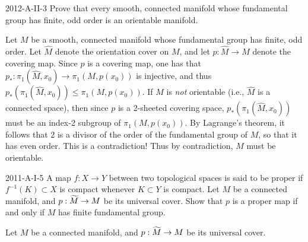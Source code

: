 \documentclass{article}
\begin{document}
	\begin{prb}{2012-A-II-3}
		Prove that every smooth, connected manifold whose fundamental group has finite, odd order is an orientable manifold. 
	\end{prb}
	Let $M$ be a smooth, connected manifold whose fundamental group has finite, odd order. Let $\hat{M}$ denote the orientation cover on $M$, and let $p: \hat{M} \to M$ denote the covering map. Since $p$ is a covering map, one has that $p_{\ast}: \pi_1(\hat{M}, x_0) \to \pi_1(M, p(x_0))$ is injective, and thus $p_\ast(\pi_1(\hat{M}, x_0)) \leq \pi_1(M, p(x_0))$. If $M$ is \textit{not} orientable (i.e., $\hat{M}$ is a connected space), then since $p$ is a 2-sheeted covering space, $p_\ast(\pi_1(\hat{M}, x_0))$ must be an index-2 subgroup of $\pi_1(M,p(x_0))$. By Lagrange's theorem, it follows that $2$ is a divisor of the order of the fundamental group of $M$, so that it has even order. This is a contradiction! Thus by contradiction, $M$ must be orientable. 
	
	\begin{prb}{2011-A-I-5}
		A map $f: X \to Y$ between two topological spaces is said to be proper if $f^{-1}(K) \subset X$ is compact whenever $K \subset Y$ is compact. Let $M$ be a connected manifold, and $p: \widetilde{M} \to M$ be its universal cover. Show that $p$ is a proper map if and only if $M$ has finite fundamental group. 
	\end{prb}
	Let $M$ be a connected manifold, and $p: \widetilde{M} \to M$ be its universal cover. 
	
\end{document}
